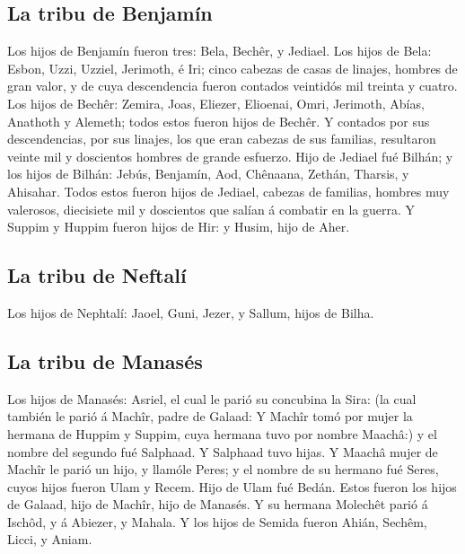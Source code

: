 \hypertarget{la-tribu-de-benjamuxedn}{%
\subsection{La tribu de Benjamín}\label{la-tribu-de-benjamuxedn}}

 Los hijos de Benjamín fueron tres: Bela, Bechêr, y Jediael.
 Los hijos de Bela: Esbon, Uzzi, Uzziel, Jerimoth, é Iri;
cinco cabezas de casas de linajes, hombres de gran valor, y de cuya
descendencia fueron contados veintidós mil treinta y cuatro.
 Los hijos de Bechêr: Zemira, Joas, Eliezer, Elioenai, Omri,
Jerimoth, Abías, Anathoth y Alemeth; todos estos fueron hijos de Bechêr.
 Y contados por sus descendencias, por sus linajes, los que
eran cabezas de sus familias, resultaron veinte mil y doscientos hombres
de grande esfuerzo.  Hijo de Jediael fué Bilhán; y los
hijos de Bilhán: Jebús, Benjamín, Aod, Chênaana, Zethán, Tharsis, y
Ahisahar.  Todos estos fueron hijos de Jediael, cabezas de
familias, hombres muy valerosos, diecisiete mil y doscientos que salían
á combatir en la guerra.  Y Suppim y Huppim fueron hijos de
Hir: y Husim, hijo de Aher.

\hypertarget{la-tribu-de-neftaluxed}{%
\subsection{La tribu de Neftalí}\label{la-tribu-de-neftaluxed}}

 Los hijos de Nephtalí: Jaoel, Guni, Jezer, y Sallum, hijos
de Bilha.

\hypertarget{la-tribu-de-manasuxe9s}{%
\subsection{La tribu de Manasés}\label{la-tribu-de-manasuxe9s}}

 Los hijos de Manasés: Asriel, el cual le parió su
concubina la Sira: (la cual también le parió á Machîr, padre de Galaad:
 Y Machîr tomó por mujer la hermana de Huppim y Suppim,
cuya hermana tuvo por nombre Maachâ:) y el nombre del segundo fué
Salphaad. Y Salphaad tuvo hijas.  Y Maachâ mujer de Machîr
le parió un hijo, y llamóle Peres; y el nombre de su hermano fué Seres,
cuyos hijos fueron Ulam y Recem.  Hijo de Ulam fué Bedán.
Estos fueron los hijos de Galaad, hijo de Machîr, hijo de Manasés.
 Y su hermana Molechêt parió á Ischôd, y á Abiezer, y
Mahala.  Y los hijos de Semida fueron Ahián, Sechêm, Licci,
y Aniam.

